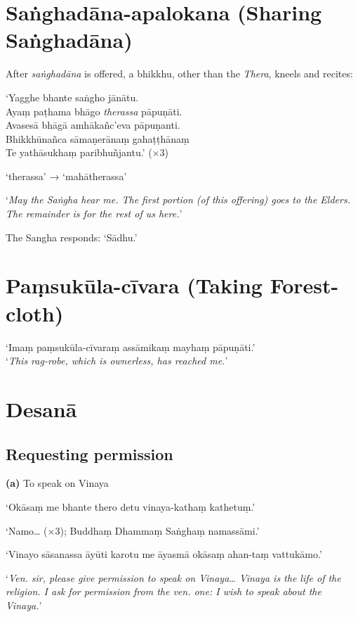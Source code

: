 \section{Saṅghadāna-apalokana (Sharing Saṅghadāna)}

After \emph{saṅghadāna} is offered, a bhikkhu, other than the \emph{Thera},
kneels and recites:

‘Yagghe bhante saṅgho jānātu.\\
Ayaṃ paṭhama bhāgo \emph{therassa} pāpuṇāti.\\
Avasesā bhāgā amhākañc’eva pāpuṇanti.\\
Bhikkhūnañca sāmaṇerānaṃ gahaṭṭhānaṃ\\
Te yathāsukhaṃ paribhuñjantu.’ (×3)

‘therassa’ → ‘mahātherassa’

‘\emph{May the Saṅgha hear me. The first portion (of this offering) goes to the
Elders. The remainder is for the rest of us here.}’

The Sangha responds: ‘Sādhu.’ 

\section{Paṃsukūla-cīvara (Taking Forest-cloth)}

‘Imaṃ paṃsukūla-cīvaraṃ assāmikaṃ mayhaṃ pāpuṇāti.’\\
‘\emph{This rag-robe, which is ownerless, has reached me.}’

\section{Desanā}

\subsection{Requesting permission}

\textbf{(a)} To speak on Vinaya


‘Okāsaṃ me bhante thero detu vinaya-kathaṃ kathetuṃ.’

‘Namo… (×3); Buddhaṃ Dhammaṃ Saṅghaṃ namassāmi.’

‘Vinayo sāsanassa āyūti karotu me āyasmā okāsaṃ ahan-taṃ vattukāmo.’

‘\emph{Ven. sir, please give permission to speak on Vinaya… Vinaya is the life
  of the religion. I ask for permission from the ven. one: I wish to speak about
  the Vinaya.}’

